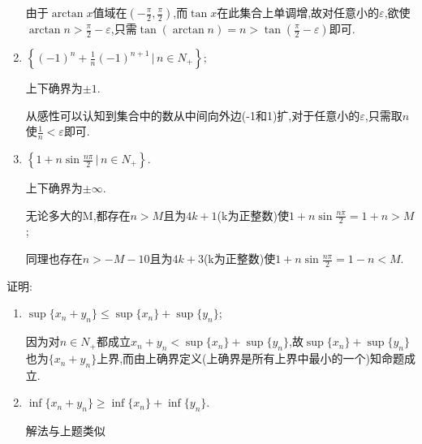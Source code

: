 \documentclass[cn,chinese,fontset]{elegantbook}
\begin{document}
\begin{exercise}
\begin{enumerate}
\begin{solution}
                        由于$\arctan x$值域在$\left(-\frac{\pi}{2},\frac{\pi}{2}\right)$,而$\tan x$在此集合上单调增,故对任意小的$\varepsilon$,欲使$\arctan n>\frac{\pi}{2}-\varepsilon$,只需$\tan(\arctan n)=n>\tan\left(\frac{\pi}{2}-\varepsilon\right)$即可.
            
                    \end{solution}
                    \item $\left\{(-1)^n+\frac{1}{n}(-1)^{n+1}\,\biggl\lvert\, n\in N_+\right\};$
                    \begin{solution}
                        上下确界为$\pm 1$.
            
                        从感性可以认知到集合中的数从中间向外边(-1和1)扩,对于任意小的$\varepsilon$,只需取$n$使$\frac{1}{n}<\varepsilon$即可.
                    \end{solution}
                    \item $\left\{1+n\sin\frac{n\pi}{2}\,\bigg\lvert\, n\in N_+\right\}$.
                    \begin{solution}
                        上下确界为$\pm \infty$.
            
                        无论多大的M,都存在$n>M$且为$4k+1$(k为正整数)使$1+n\sin\frac{n\pi}{2}=1+n>M$;
            
                        同理也存在$n>-M-10$且为$4k+3$(k为正整数)使$1+n\sin\frac{n\pi}{2}=1-n<M$.
                    \end{solution}
                \end{enumerate}
            \end{exercise}

            \begin{exercise}
                证明:
                \begin{enumerate}
                    \item $\sup\{x_n+y_n\}\leqslant \sup\{x_n\}+\sup\{y_n\}$;
                    \begin{solution}
                        因为对$n\in N_+$都成立$x_n+y_n<\sup\{x_n\}+\sup\{y_n\}$,故$\sup\{x_n\}+\sup\{y_n\}$也为$\{x_n+y_n\}$上界,而由上确界定义(上确界是所有上界中最小的一个)知命题成立.
                    \end{solution}
                    \item $\inf\{x_n+y_n\}\geqslant\inf\{x_n\}+\inf\{y_n\}$.
                    \begin{solution}
                        解法与上题类似
                    \end{solution}
                \end{enumerate}
            \end{exercise}
\end{document}
